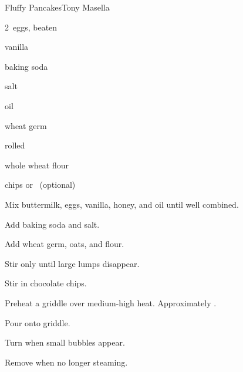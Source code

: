 \begin{recipe}{Fluffy Pancakes}{Tony Masella}{}

\begin{ingredients}
\item {} 
\item 2~eggs, beaten
\item {} vanilla
\item {} baking soda
\item \tp{\half} salt
\item \C{\quarter} oil
\item \C{\quarter} 
\item \C{\quarter} wheat germ
\item \C{\quarter} rolled 
\item \C{1\half} whole wheat flour
\item {} chips or ~(optional)
\end{ingredients}

\begin{directions}
\item Mix buttermilk, eggs, vanilla, honey, and oil until well combined.
\item Add baking soda and salt.
\item Add wheat germ, oats, and flour.
\item Stir only until large lumps disappear.
\item Stir in chocolate chips.
\item Preheat a griddle over medium-high heat. Approximately .
\item Pour onto griddle.
\item Turn when small bubbles appear.
\item Remove when no longer steaming.
\end{directions}

\end{recipe}

